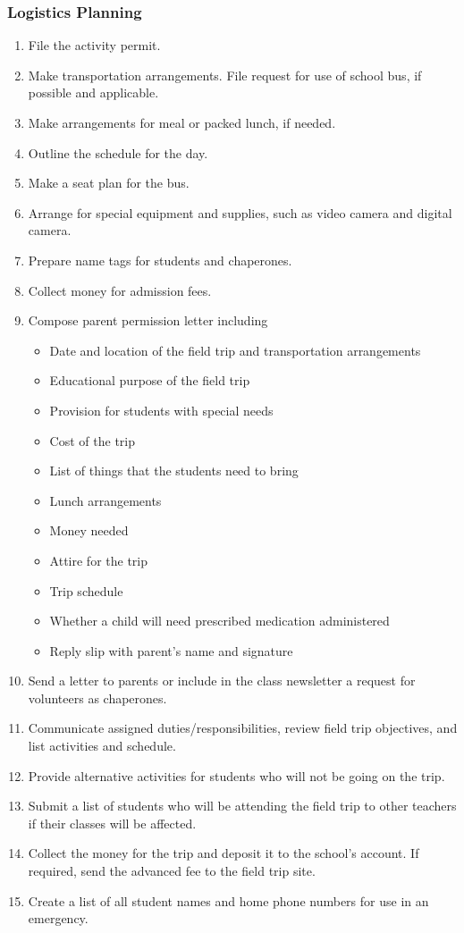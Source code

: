 \subsubsection*{Logistics Planning}
\begin{enumerate}
\item File the activity permit.
\item Make transportation arrangements. File request for use of school bus, if possible and applicable.
\item Make arrangements for meal or packed lunch, if needed.
\item Outline the schedule for the day.
\item Make a seat plan for the bus.
\item Arrange for special equipment and supplies, such as video camera and digital camera.
\item Prepare name tags for students and chaperones.
\item Collect money for admission fees.
\item Compose parent permission letter including
  \begin{itemize}
	\item Date and location of the field trip and transportation arrangements
	\item Educational purpose of the field trip
	\item Provision for students with special needs
	\item Cost of the trip
	\item List of things that the students need to bring
	\item Lunch arrangements
	\item Money needed
	\item Attire for the trip
	\item Trip schedule
	\item Whether a child will need prescribed medication administered
	\item Reply slip with parent's name and signature
	\end{itemize}
\item Send a letter to parents or include in the class newsletter a request for volunteers as
chaperones.
\item Communicate assigned duties/responsibilities, review field trip objectives, and list activities and
schedule.
\item Provide alternative activities for students who will not be going on the trip.
\item Submit a list of students who will be attending the field trip to other teachers if their classes will
be affected.
\item Collect the money for the trip and deposit it to the school's account. If required, send the
advanced fee to the field trip site.
\item Create a list of all student names and home phone numbers for use in an emergency.
\end{enumerate}
